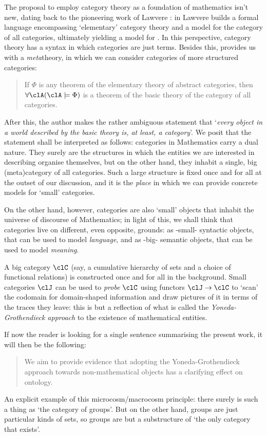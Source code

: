 The proposal to employ category theory as a foundation of mathematics isn't new, dating back to the pioneering work of Lawvere \cite{lawvere1964elementary,lajolla,lawvere1969adjointness,lawvere1963functorial}: in \cite{lajolla} Lawvere builds a formal language  encompassing `elementary' category theory and a model  for the category of all categories, ultimately yielding a model for . In this perspective, category theory has a syntax in which categories are just terms. Besides this,  provides us with a \emph{meta}theory, in which we can consider categories of more structured categories:
\begin{quote}
  If $\Phi$ is any theorem of the elementary theory of abstract categories, then $\forall \clA (\clA \models \Phi)$ is a theorem of the basic theory of the category of all categories. \hfill \cite{lajolla}
\end{quote}
After this, the author makes the rather ambiguous statement that `\textit{every object in a world described by the basic theory is, at least, a category}'. We posit that the statement shall be interpreted as follows: categories in Mathematics carry a dual nature. They surely are the structures in which the entities we are interested in describing organise themselves, but on the other hand, they inhabit a single, big (meta)category of all categories. Such a large structure is fixed once and for all at the outset of our discussion, and it is the \emph{place} in which we can provide concrete models for `small' categories.

On the other hand, however, categories are also `small' objects that inhabit the universe of discourse of Mathematics; in light of this, we shall think that categories live on different, even opposite, grounds: as -small- syntactic objects, that can be used to model \emph{language}, and as -big- semantic objects, that can be used to model \emph{meaning}.

A big category $\clC$ (say, a cumulative hierarchy of sets and a choice of functional relations) is constructed once and for all in the background. Small categories $\clJ$ can be used to \emph{probe} $\clC$ using functors $\clJ \to \clC$ to `scan' the codomain for domain-shaped information and draw pictures of it in terms of the traces they leave: this is but a reflection of what is called the \emph{Yoneda-Grothendieck approach} to the existence of mathematical entities.

If now the reader is looking for a single sentence summarising the present work, it will then be the following:
\begin{quote}
  We aim to provide evidence that adopting the Yoneda-Grothendieck approach towards non-mathematical objects has a clarifying effect on ontology.
\end{quote}
An explicit example of this microcosm\fshyp{}macrocosm principle: there surely is such a thing as `the category of groups'. But on the other hand, groups are just particular kinds of sets, so groups are but a substructure of `the only category that exists'.

